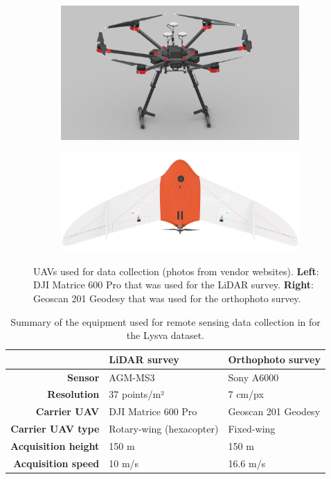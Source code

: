 \begin{figure}
\centering
\begin{subfigure}[b]{0.45\textwidth}
    \centering
    \includegraphics[width=\textwidth]{../images/dji-matrice-600-pro.jpeg}
\end{subfigure}
\hfill
\begin{subfigure}[b]{0.45\textwidth}
    \centering
    \includegraphics[width=\textwidth]{../images/geoscan_201_geodesy.jpg}
\end{subfigure}
\caption{
    UAVs used for data collection (photos from vendor websites).
    \textbf{Left}: DJI Matrice 600 Pro that was used for the LiDAR survey.
    \textbf{Right}: Geoscan 201 Geodesy that was used for the orthophoto survey.
}
\label{fig-uavs}
\end{figure}

\begin{table}
    \centering
    \caption{Summary of the equipment used for remote sensing data collection in for the Lysva dataset.}
    \label{tbl-lysva-plot-stats}
    \begin{tabular}{rll}
        & \textbf{LiDAR survey} & \textbf{Orthophoto survey} \\
        \toprule
        \textbf{Sensor} & AGM-MS3 & Sony A6000 \\
        \textbf{Resolution} & 37 points/m² & 7 cm/px \\
        \textbf{Carrier UAV} & DJI Matrice 600 Pro & Geoscan 201 Geodesy \\
        \textbf{Carrier UAV type} & Rotary-wing (hexacopter) & Fixed-wing \\
        \textbf{Acquisition height} & 150 m & 150 m \\
        \textbf{Acquisition speed} & 10 m/s & 16.6 m/s \\
        \bottomrule
    \end{tabular}
\end{table}

